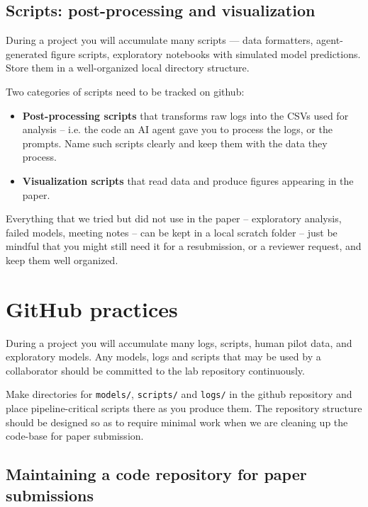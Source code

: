\documentclass[11pt, letterpaper]{article}
\begin{document}
\subsection{Scripts: post-processing and visualization}

During a project you will accumulate many scripts --- data formatters, agent-generated figure scripts, exploratory notebooks with simulated model predictions. Store them in a well-organized local directory structure. 

Two categories of scripts need to be tracked on github:

\begin{itemize}[itemsep=0.2em]
  \item \textbf{Post-processing scripts} that transforms raw logs into the CSVs used for analysis -- i.e. the code an AI agent gave you to process the logs, or the prompts. Name such scripts clearly and keep them with the data they process.
  \item \textbf{Visualization scripts} that read data and produce figures appearing in the paper. 
\end{itemize}

Everything that we tried but did not use in the paper -- exploratory analysis, failed models, meeting notes -- can be kept in a local scratch folder -- just be mindful that you might still need it for a resubmission, or a reviewer request, and keep them well organized. 


\section{GitHub practices}

During a project you will accumulate many logs, scripts, human pilot data, and exploratory models. Any models, logs and scripts that may be used by a collaborator should be committed to the lab repository continuously.

Make directories for \texttt{models/}, \texttt{scripts/} and \texttt{logs/} in the github repository and place pipeline-critical scripts there as you produce them. The repository structure should be designed so as to require minimal work when we are cleaning up the code-base for paper submission. 

\subsection{Maintaining a code repository for paper submissions}
\end{document}

